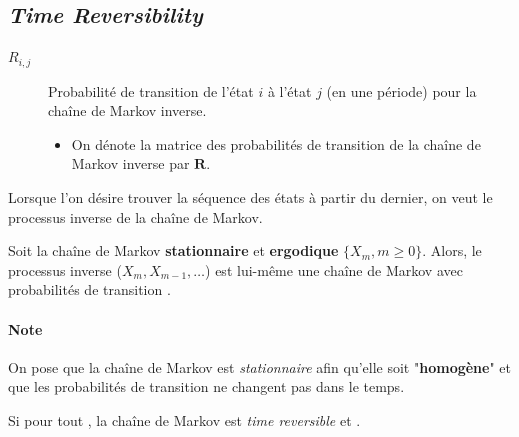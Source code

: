 \documentclass[french]{article}
\begin{document}
\begin{multicols*}{2}
\columnbreak
\subsection{\og \textit{Time Reversibility} \fg{}}
\begin{distributions}[Notation]
\begin{description}
	\item[$R_{i, j}$]	Probabilité de transition de l'état $i$ à l'état $j$ (en une période) pour la chaîne de Markov inverse.
		\begin{itemize}
		\item	On dénote la matrice des probabilités de transition de la chaîne de Markov inverse par $\bm{R}$.
		\end{itemize}
\end{description}
\end{distributions}

\begin{rappel_enhanced}[Contexte]
Lorsque l'on désire trouver la séquence des états à partir du dernier, on veut le processus inverse de la chaîne de Markov.
\end{rappel_enhanced}

\begin{definitionNOHFILL}
Soit la chaîne de Markov \textbf{stationnaire} et \textbf{ergodique} $\{X_{m}, m \geq 0\}$. Alors, le processus inverse ($X_{m}, X_{m - 1}, \dots$) est lui-même une chaîne de Markov avec probabilités de transition .

\paragraph{Note}	On pose que la chaîne de Markov est \textit{stationnaire} afin qu'elle soit "\textbf{homogène}" et que les probabilités de transition ne changent pas dans le temps.
\end{definitionNOHFILL}


\begin{definitionNOHFILLsub}
Si  pour tout , la chaîne de Markov est \og \textit{time reversible} \fg{} et .

\bigskip


\end{definitionNOHFILLsub}
\end{multicols*}
\end{document}
